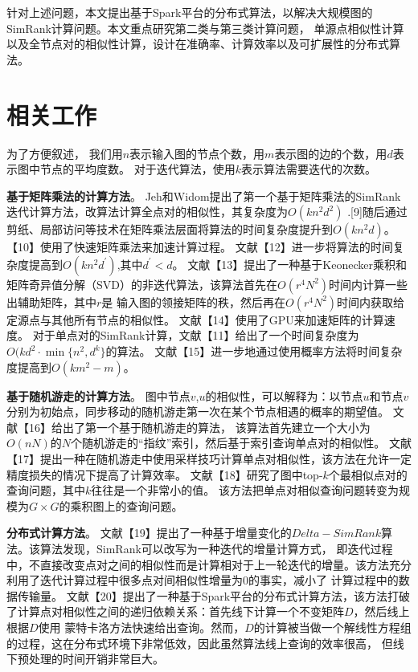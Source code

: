 \documentclass[master]{njuthesis}
\begin{document}
针对上述问题，本文提出基于Spark平台的分布式算法，以解决大规模图的SimRank计算问题。本文重点研究第二类与第三类计算问题，
单源点相似性计算以及全节点对的相似性计算，设计在准确率、计算效率以及可扩展性的分布式算法。


\section{相关工作}
为了方便叙述， 我们用$n$表示输入图的节点个数，用$m$表示图的边的个数，用$d$表示图中节点的平均度数。 
对于迭代算法，使用$k$表示算法需要迭代的次数。

\textbf{基于矩阵乘法的计算方法}。 Jeh和Widom提出了第一个基于矩阵乘法的SimRank迭代计算方法，改算法计算全点对的相似性，其复杂度为$O(kn^2d^2)$
.[9]随后通过剪纸、局部访问等技术在矩阵乘法层面将算法的时间复杂度提升到$O(kn^2d)$。【10】使用了快速矩阵乘法来加速计算过程。
文献【12】进一步将算法的时间复杂度提高到$O(kn^2d^{\prime})$,其中$d^\prime < d$。
文献【13】提出了一种基于Keonecker乘积和矩阵奇异值分解（SVD）的非迭代算法，该算法首先在$O(r^4N^2)$时间内计算一些出辅助矩阵，其中$r$是
输入图的领接矩阵的秩，然后再在$O(r^4N^2)$时间内获取给定源点与其他所有节点的相似性。
文献【14】使用了GPU来加速矩阵的计算速度。
对于单点对的SimRank计算，文献【11】给出了一个时间复杂度为$O(kd^2\cdot \min{\{n^2, d^k\}}$的算法。
文献【15】进一步地通过使用概率方法将时间复杂度提高到$O(km^2-m)$。

\textbf{基于随机游走的计算方法}。
图中节点$v$,$u$的相似性，可以解释为：以节点$u$和节点$v$分别为初始点，同步移动的随机游走第一次在某个节点相遇的概率的期望值。
文献【16】给出了第一个基于随机游走的算法， 该算法首先建立一个大小为$O(nN)$的$N$个随机游走的“指纹”索引，然后基于索引查询单点对的相似性。
文献【17】提出一种在随机游走中使用采样技巧计算单点对相似性，该方法在允许一定精度损失的情况下提高了计算效率。
文献【18】研究了图中top-$k$个最相似点对的查询问题，其中$k$往往是一个非常小的值。
该方法把单点对相似查询问题转变为规模为$G\times G$的乘积图上的查询问题。

\textbf{分布式计算方法}。 文献【19】提出了一种基于增量变化的$Delta-SimRank$算法。该算法发现，SimRank可以改写为一种迭代的增量计算方式，
即迭代过程中，不直接改变点对之间的相似性而是计算相对于上一轮迭代的增量。该方法充分利用了迭代计算过程中很多点对间相似性增量为0的事实，减小了
计算过程中的数据传输量。
文献【20】提出了一种基于Spark平台的分布式计算方法，该方法打破了计算点对相似性之间的递归依赖关系：首先线下计算一个不变矩阵$D$，然后线上根据$D$使用
蒙特卡洛方法快速给出查询。然而，$D$的计算被当做一个解线性方程组的过程，这在分布式环境下非常低效，因此虽然算法线上查询的效率很高，
但线下预处理的时间开销非常巨大。
\end{document}
